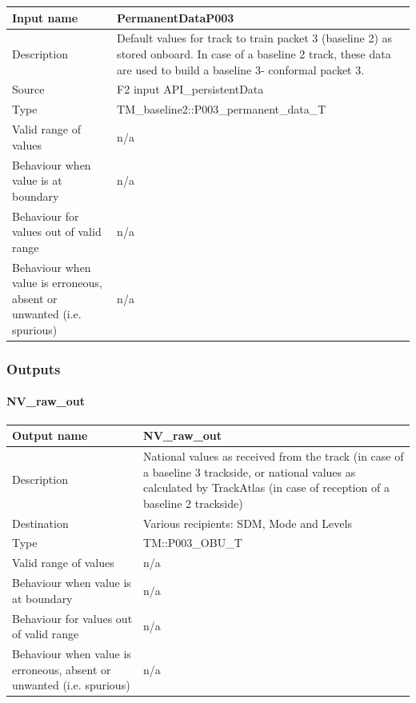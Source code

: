 \begin{longtable}{p{}p{}}
\toprule
Input name				& PermanentDataP003\\
\midrule
Description				& Default values for track to train packet 3 (baseline 2) as stored onboard. In case of a baseline 2 track, these data are used to build a baseline 3- conformal packet 3. \\
\midrule
Source					& F2 input API\_persistentData\\ 
\midrule
Type					& TM\_baseline2::P003\_permanent\_data\_T\\
\midrule
Valid range of values	& n/a \\
\midrule
Behaviour when value is at boundary	& n/a\\
\midrule
Behaviour for values out of valid range	& n/a\\
\midrule
Behaviour when value is erroneous, absent or unwanted (i.e. spurious) & n/a\\

\bottomrule


\end{longtable}


\subsubsection{Outputs}\label{s:manage_track_data_outputs}

\paragraph{NV\_raw\_out}

\begin{longtable}{p{}p{}}
\toprule
Output name				& NV\_raw\_out \\
\midrule
Description				& National values as received from the track (in case of a baseline 3 trackside, or national values as calculated by TrackAtlas (in case of reception of a baseline 2 trackside) \\
\midrule
Destination				& Various recipients: SDM, Mode and Levels\\ 
\midrule
Type					& TM::P003\_OBU\_T \\
\midrule
Valid range of values	& n/a \\
\midrule
Behaviour when value is at boundary	& n/a  \\
\midrule
Behaviour for values out of valid range	& n/a  \\
\midrule
Behaviour when value is erroneous, absent or unwanted (i.e. spurious) & n/a  \\
\bottomrule
\end{longtable}


